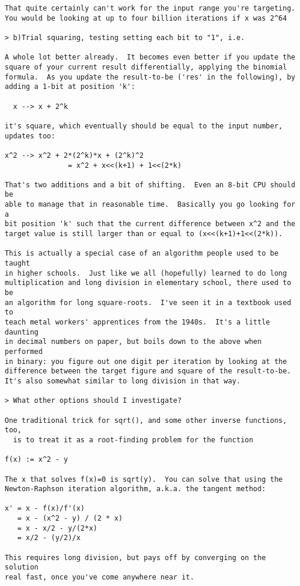 \begin{tiny}
\begin{verbatim}
That quite certainly can't work for the input range you're targeting. 
You would be looking at up to four billion iterations if x was 2^64

> b)Trial squaring, testing setting each bit to "1", i.e.

A whole lot better already.  It becomes even better if you update the 
square of your current result differentially, applying the binomial 
formula.  As you update the result-to-be ('res' in the following), by 
adding a 1-bit at position 'k':

  x --> x + 2^k

it's square, which eventually should be equal to the input number, 
updates too:

x^2 --> x^2 + 2*(2^k)*x + (2^k)^2
               = x^2 + x<<(k+1) + 1<<(2*k)

That's two additions and a bit of shifting.  Even an 8-bit CPU should be 
able to manage that in reasonable time.  Basically you go looking for a 
bit position 'k' such that the current difference between x^2 and the 
target value is still larger than or equal to (x<<(k+1)+1<<(2*k)).

This is actually a special case of an algorithm people used to be taught 
in higher schools.  Just like we all (hopefully) learned to do long 
multiplication and long division in elementary school, there used to be 
an algorithm for long square-roots.  I've seen it in a textbook used to 
teach metal workers' apprentices from the 1940s.  It's a little daunting 
in decimal numbers on paper, but boils down to the above when performed 
in binary: you figure out one digit per iteration by looking at the 
difference between the target figure and square of the result-to-be. 
It's also somewhat similar to long division in that way.

> What other options should I investigate?

One traditional trick for sqrt(), and some other inverse functions, too, 
  is to treat it as a root-finding problem for the function

f(x) := x^2 - y

The x that solves f(x)=0 is sqrt(y).  You can solve that using the 
Newton-Raphson iteration algorithm, a.k.a. the tangent method:

x' = x - f(x)/f'(x)
   = x - (x^2 - y) / (2 * x)
   = x - x/2 - y/(2*x)
   = x/2 - (y/2)/x

This requires long division, but pays off by converging on the solution 
real fast, once you've come anywhere near it.


\end{verbatim}
\end{tiny}
